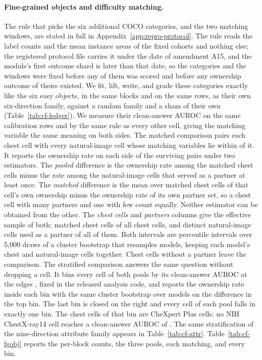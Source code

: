 \paragraph{Fine-grained objects and difficulty matching.} The rule that picks the six additional COCO categories, and the two matching windows, are stated in full in Appendix~\ref{app:repro-protocol}. The rule reads the label counts and the mean instance areas of the fixed cohorts and nothing else; the registered protocol file carries it under the date of amendment A15, and the module's first outcome shard is later than that date, so the categories and the windows were fixed before any of them was scored and before any ownership outcome of theirs existed. We fit, lift, write, and grade these categories exactly like the six easy objects, in the same blocks and on the same rows, as their own six-direction family, against a random family and a sham of their own (Table~\ref{tab:cf-ledger}). We measure their clean-answer AUROC on the same calibration rows and by the same rule as every other cell, giving the matching variable the same meaning on both sides. The matched comparison pairs each chest cell with every natural-image cell whose matching variables lie within \cfFgWindow{} of it. It reports the ownership rate on each side of the surviving pairs under two estimators. The \emph{pooled} difference is the ownership rate among the matched chest cells minus the rate among the natural-image cells that served as a partner at least once. The \emph{matched} difference is the mean over matched chest cells of that cell's own ownership minus the ownership rate of its own partner set, so a chest cell with many partners and one with few count equally. Neither estimator can be obtained from the other. The \emph{chest cells} and \emph{partners} columns give the effective sample of both: matched chest cells of all chest cells, and distinct natural-image cells used as a partner of all of them. Both intervals are percentile intervals over 5{,}000 draws of a cluster bootstrap that resamples models, keeping each model's chest and natural-image cells together. Chest cells without a partner leave the comparison. The stratified comparison answers the same question without dropping a cell. It bins every cell of both pools by its clean-answer AUROC at the edges \cfStratEdges{}, fixed in the released analysis code, and reports the ownership rate inside each bin with the same cluster bootstrap over models on the difference in the top bin. The last bin is closed on the right and every cell of each pool falls in exactly one bin. The \cfStratChestTopN{} chest cells of that bin are CheXpert Plus cells; no NIH ChestX-ray14 cell reaches a clean-answer AUROC of \cfStratTopEdge{}. The same stratification of the nine-direction attribute family appears in Table~\ref{tab:cf-attr}. Table~\ref{tab:cf-fgobj} reports the per-block counts, the three pools, each matching, and every bin.

